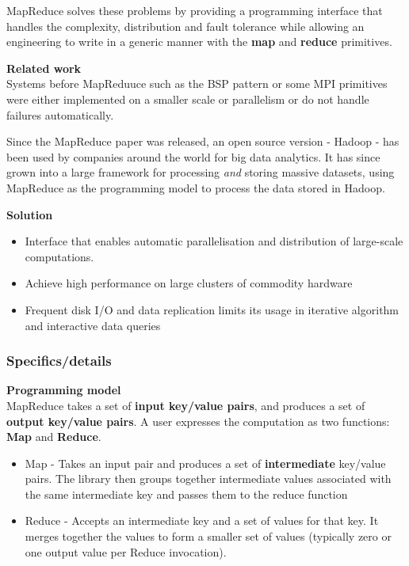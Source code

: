 \documentclass{sty/SizheArticle}
\begin{document}
MapReduce solves these problems by providing a programming interface that
handles the complexity, distribution and fault tolerance while allowing
an engineering to write in a generic manner with the \textbf{map} and
\textbf{reduce} primitives.

\textbf{Related work} \\
Systems before MapReduuce such as the BSP pattern or some MPI primitives
were either implemented on a smaller scale or parallelism or do not
handle failures automatically. 

Since the MapReduce paper was released, an open source version - Hadoop -
has been used by companies around the world for big data analytics. It has
since grown into a large framework for processing \textit{and} storing
massive datasets, using MapReduce as the programming model to process the
data stored in Hadoop.

\textbf{Solution}
\begin{itemize}
\item Interface that enables automatic parallelisation and distribution 
of large-scale computations.
\item Achieve high performance on large clusters of commodity hardware
\item Frequent disk I/O and data replication limits its usage in
iterative algorithm and interactive data queries
\end{itemize}


\subsubsection{Specifics/details}
\textbf{Programming model} \\
MapReduce takes a set of \textbf{input key/value pairs}, and produces a set
of \textbf{output key/value pairs}. A user expresses the computation as two
functions: \textbf{Map} and \textbf{Reduce}.
\begin{itemize}
\item Map - Takes an input pair and produces a set of \textbf{intermediate}
key/value pairs. The library then groups together intermediate values
associated with the same intermediate key and passes them to the reduce function
\item Reduce - Accepts an intermediate key and a set of values for that key.
It merges together the values to form a smaller set of values (typically zero
or one output value per Reduce invocation).
\end{itemize}
\end{document}
